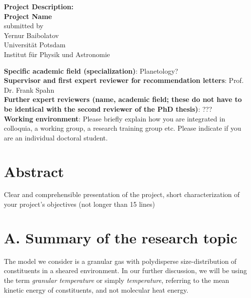 \documentclass[11pt, notitlepage]{article} %
\begin{document}

\begin{center}
{\Large \textbf{Project Description:}}\\  
\vspace{.5cm}
{\LARGE\textbf{Project Name}} 
\\[.75cm] 
submitted by\\
{Yernur Baibolatov\\
Universit\"at Potsdam\\
Institut f\"ur Physik und Astronomie}
\end{center}
\noindent\textbf{Specific academic field (specialization)}: Planetology?
\\[.75cm] 
\textbf{Supervisor and first expert reviewer for recommendation letters}: Prof. Dr. Frank Spahn
\\[.75cm] 
\textbf{Further expert reviewers (name, academic field; these do not have to be identical with the second reviewer of the PhD thesis)}: ???
\\[.75cm] 
\textbf{Working environment}: Please  briefly  explain  how you  are  integrated  in  colloquia, a  working  group,   a  research  training group etc.  Please indicate if you are an individual doctoral student.

\section*{Abstract}
Clear  and  comprehensible  presentation  of  the  project,  short  characterization  of  your  project’s  objectives (not longer than 15 lines)



\newpage

\section*{A. Summary of the research topic}

The model we consider is a granular gas with polydisperse size-distribution 
of constituents in a sheared environment. In our further discussion, we will be
using the term \emph{granular temperature} or simply \emph{temperature}, 
referring to the mean kinetic energy of constituents, and not molecular heat energy.
\end{document}
